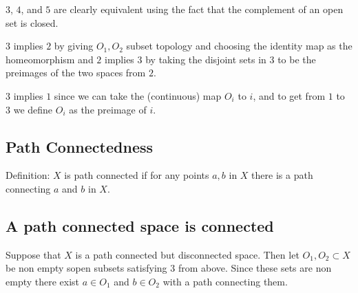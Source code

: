 \documentclass{homework}
\begin{document}
$3$, $4$, and $5$ are clearly equivalent using the fact that the complement of an open set is closed. 

$3$ implies $2$ by giving $O_1,O_2$ subset topology and choosing the identity map as the homeomorphism and $2$ implies $3$ by taking the disjoint sets in $3$ to be the preimages of the two spaces from $2$.

$3$ implies $1$ since we can take the (continuous) map $O_i$ to $i$, and to get from $1$ to $3$ we define $O_i$ as the preimage of $i$. 

\subsection{Path Connectedness}

Definition: $X$ is path connected if for any points $a,b$ in $X$ there is a path connecting $a$ and $b$ in $X$. 


\subsection{A path connected space is connected}

Suppose that $X$ is a path connected but disconnected space. Then let $O_1,O_2 \subset X$ be non empty sopen subsets satisfying $3$ from above. Since these sets are non empty there exist $a \in O_1$ and $b \in O_2$ with a path connecting them.
\end{document}
